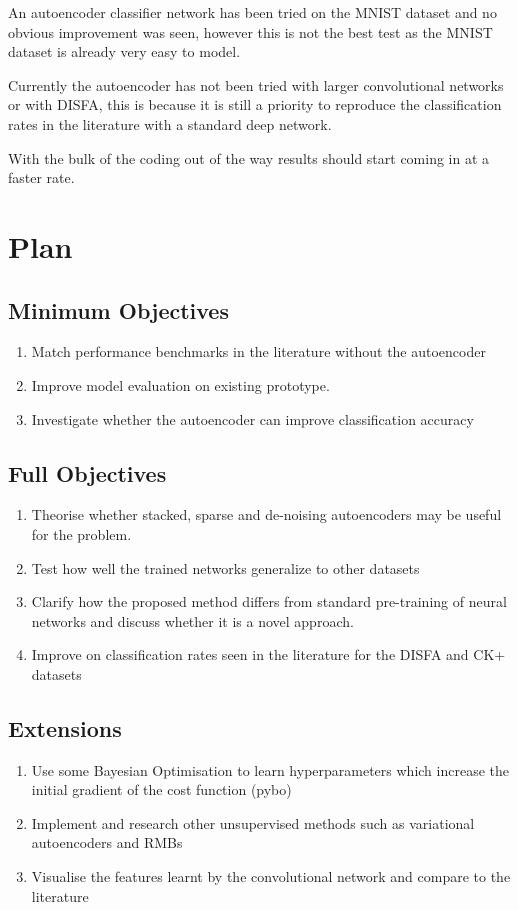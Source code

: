 \documentclass[9pt]{article} \usepackage{amsmath, amsthm, amssymb}
\begin{document}
An autoencoder classifier  network has been tried on the MNIST dataset and no obvious improvement
was seen, however this is not the best test as the MNIST dataset is already very easy to model.

Currently the autoencoder has not been tried with larger convolutional networks or with DISFA,
this is because it is still a priority to reproduce the classification rates in the literature
with a standard deep network. 

With the bulk of the coding out of the way results should start coming in at a faster rate.

%
%
%
\section{Plan}
\subsection{Minimum Objectives}
\begin{enumerate}
  \item Match performance benchmarks in the literature without the autoencoder
  \item Improve model evaluation on existing prototype.
  \item Investigate whether the autoencoder can improve classification accuracy
\end{enumerate}
\subsection{Full Objectives}
\begin{enumerate}
  \item Theorise whether stacked, sparse and de-noising autoencoders may
        be useful for the problem.
  \item Test how well the trained networks generalize to other datasets
  \item Clarify how the proposed method differs from standard pre-training of
        neural networks and discuss whether it is a novel approach.
  \item Improve on classification rates seen in the literature for the DISFA and CK+ datasets
\end{enumerate}
\subsection{Extensions}
\begin{enumerate}
  \item Use some Bayesian Optimisation to learn hyperparameters which increase
        the initial gradient of the cost function (pybo)
  \item Implement and research other unsupervised methods such as variational
        autoencoders and RMBs
  \item Visualise the features learnt by the convolutional network and compare
        to the literature
\end{enumerate}




\end{document}

